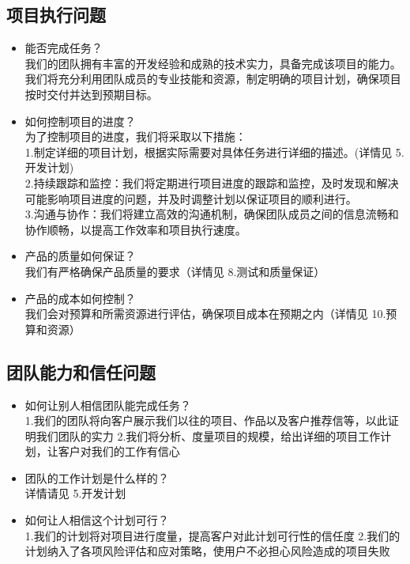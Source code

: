 \documentclass{article}
\begin{document}
\subsection{项目执行问题}
\begin{itemize}
	\item 能否完成任务？\\
	我们的团队拥有丰富的开发经验和成熟的技术实力，具备完成该项目的能力。我们将充分利用团队成员的专业技能和资源，制定明确的项目计划，确保项目按时交付并达到预期目标。
	\item 如何控制项目的进度？\\
	为了控制项目的进度，我们将采取以下措施：\\
	1.制定详细的项目计划，根据实际需要对具体任务进行详细的描述。(详情见 5.开发计划)\\
	2.持续跟踪和监控：我们将定期进行项目进度的跟踪和监控，及时发现和解决可能影响项目进度的问题，并及时调整计划以保证项目的顺利进行。\\
	3.沟通与协作：我们将建立高效的沟通机制，确保团队成员之间的信息流畅和协作顺畅，以提高工作效率和项目执行速度。\\
	\item 产品的质量如何保证？\\
	我们有严格确保产品质量的要求（详情见 8.测试和质量保证）
	\item 产品的成本如何控制？\\
	我们会对预算和所需资源进行评估，确保项目成本在预期之内（详情见 10.预算和资源）
\end{itemize}

\subsection{团队能力和信任问题}
\begin{itemize}
	\item 如何让别人相信团队能完成任务？\\
	1.我们的团队将向客户展示我们以往的项目、作品以及客户推荐信等，以此证明我们团队的实力
	2.我们将分析、度量项目的规模，给出详细的项目工作计划，让客户对我们的工作有信心
	\item 团队的工作计划是什么样的？\\
	详情请见 5.开发计划
	\item 如何让人相信这个计划可行？\\
	1.我们的计划将对项目进行度量，提高客户对此计划可行性的信任度
	2.我们的计划纳入了各项风险评估和应对策略，使用户不必担心风险造成的项目失败
\end{itemize}
\end{document}
